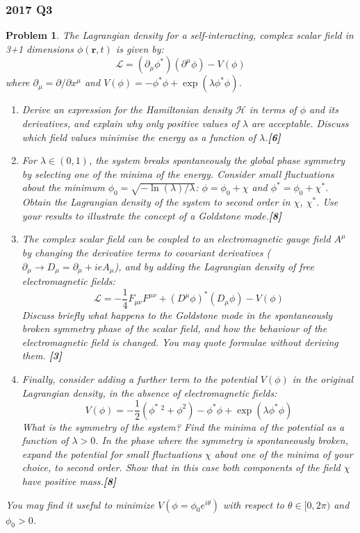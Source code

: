 \documentclass[a4paper]{article}
\theoremstyle{new}
\newtheorem{qns}{Problem}[section]
\begin{document}
\subsubsection*{2017 Q3}
\begin{qns}
The Lagrangian density for a self-interacting, complex scalar field in 3+1 dimensions $\phi(\mathbf{r}, t)$ is given by:
$$\mathcal{L}=(\partial_\mu\phi^*)(\partial^\mu\phi)-V(\phi)$$
where $\partial_\mu=\partial/\partial x^\mu$ and $V(\phi)=-\phi^*\phi+\exp(\lambda\phi^*\phi)$.
\begin{enumerate}[label=(\alph*)]
\item Derive an expression for the Hamiltonian density $\mathcal{H}$ in terms of $\phi$ and its derivatives, and explain why only positive values of $\lambda$ are acceptable. Discuss which field values minimise the energy as a function of $\lambda$.\hfill\textbf{[6]}
\item For $\lambda\in(0,1)$, the system breaks spontaneously the global phase symmetry by selecting one of the minima of the energy. Consider small fluctuations about the minimum $\phi_0=\sqrt{-\ln(\lambda)/\lambda}$: $\phi=\phi_0+\chi$ and $\phi^*=\phi_0+\chi^*$. Obtain the Lagrangian density of the system to second order in $\chi$, $\chi^*$. Use your results to illustrate the concept of a Goldstone mode.\hfill\textbf{[8]}
\item  The complex scalar field can be coupled to an electromagnetic gauge field $A^\mu$ by changing the derivative terms to covariant derivatives ($\partial_\mu\rightarrow D_\mu=\partial_\mu+ieA_\mu$), and by adding the Lagrangian density of free electromagnetic fields:
$$\mathcal{L}=-\frac{1}{4}F_{\mu\nu}F^{\mu\nu}+(D^\mu\phi)^*(D_\mu\phi)-V(\phi)$$
Discuss briefly what happens to the Goldstone mode in the spontaneously broken symmetry phase of the scalar field, and how the behaviour of the electromagnetic field is changed. You may quote formulae without deriving them. \hfill\textbf{[3]}
\item Finally, consider adding a further term to the potential $V(\phi)$ in the original Lagrangian density, in the absence of electromagnetic fields:
$$V(\phi)=-\frac{1}{2}(\phi^*~^2+\phi^2)-\phi^*\phi+\exp(\lambda\phi^*\phi)$$
What is the symmetry of the system? Find the minima of the potential as a function of $\lambda>0$. In the phase where the symmetry is spontaneously broken, expand the potential for small fluctuations $\chi$ about one of the minima of your choice, to second order. Show that in this case both components of the field $\chi$ have positive mass.\hfill\textbf{[8]}
\end{enumerate}
You may find it useful to minimize $V(\phi=\phi_0e^{i\theta})$ with respect to $\theta\in[0,2\pi)$ and $\phi_0>0$.
\end{qns}
\end{document}
